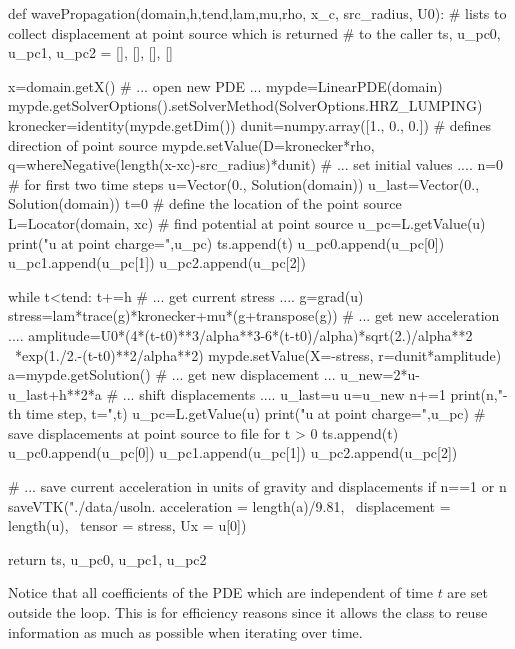 \begin{python}
  def wavePropagation(domain,h,tend,lam,mu,rho, x_c, src_radius, U0):
     # lists to collect displacement at point source which is returned
     # to the caller
     ts, u_pc0, u_pc1, u_pc2 = [], [], [], []
    
     x=domain.getX()
     # ... open new PDE ...
     mypde=LinearPDE(domain)
     mypde.getSolverOptions().setSolverMethod(SolverOptions.HRZ_LUMPING)
     kronecker=identity(mypde.getDim())
     dunit=numpy.array([1., 0., 0.]) # defines direction of point source
     mypde.setValue(D=kronecker*rho, q=whereNegative(length(x-xc)-src_radius)*dunit)
     # ... set initial values ....
     n=0
     # for first two time steps
     u=Vector(0., Solution(domain))
     u_last=Vector(0., Solution(domain))
     t=0
     # define the location of the point source 
     L=Locator(domain, xc)
     # find potential at point source
     u_pc=L.getValue(u)
     print("u at point charge=",u_pc)
     ts.append(t)
     u_pc0.append(u_pc[0])
     u_pc1.append(u_pc[1])
     u_pc2.append(u_pc[2])
  
     while t<tend:
       t+=h
       # ... get current stress ....
       g=grad(u)
       stress=lam*trace(g)*kronecker+mu*(g+transpose(g))
       # ... get new acceleration ....
       amplitude=U0*(4*(t-t0)**3/alpha**3-6*(t-t0)/alpha)*sqrt(2.)/alpha**2 \
                                               *exp(1./2.-(t-t0)**2/alpha**2)
       mypde.setValue(X=-stress, r=dunit*amplitude)
       a=mypde.getSolution()
       # ... get new displacement ...
       u_new=2*u-u_last+h**2*a
       # ... shift displacements ....
       u_last=u
       u=u_new
       n+=1
       print(n,"-th time step, t=",t)
       u_pc=L.getValue(u)
       print("u at point charge=",u_pc)
       # save displacements at point source to file for t > 0
       ts.append(t)
       u_pc0.append(u_pc[0])
       u_pc1.append(u_pc[1])
       u_pc2.append(u_pc[2])
  
       # ... save current acceleration in units of gravity and displacements 
       if n==1 or n%
         saveVTK("./data/usoln.%
                 acceleration = length(a)/9.81, \
                 displacement = length(u), \
  				 tensor = stress, Ux = u[0])
  
     return ts, u_pc0, u_pc1, u_pc2
\end{python}
Notice that all coefficients of the PDE which are independent of time $t$ are
set outside the \code{while} loop.
This is for efficiency reasons since it allows the \LinearPDE class to reuse
information as much as possible when iterating over time. 

